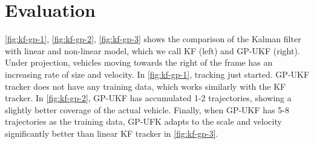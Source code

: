 \section{Evaluation}

\ref{fig:kf-gp-1}, \ref{fig:kf-gp-2}, \ref{fig:kf-gp-3} shows the comparison of the Kalman filter with linear and non-linear model, which we call KF (left) and GP-UKF (right). Under projection, vehicles moving towards the right of the frame has an increasing rate of size and velocity. 
In \ref{fig:kf-gp-1}, tracking just started. GP-UKF tracker does not have any training data, which works similarly with the KF tracker. 
In \ref{fig:kf-gp-2}, GP-UKF has accumulated 1-2 trajectories, showing a slightly better coverage of the actual vehicle. 
Finally, when GP-UKF has 5-8 trajectories as the training data, GP-UFK adapts to the scale and velocity significantly better than linear KF tracker in \ref{fig:kf-gp-3}.

